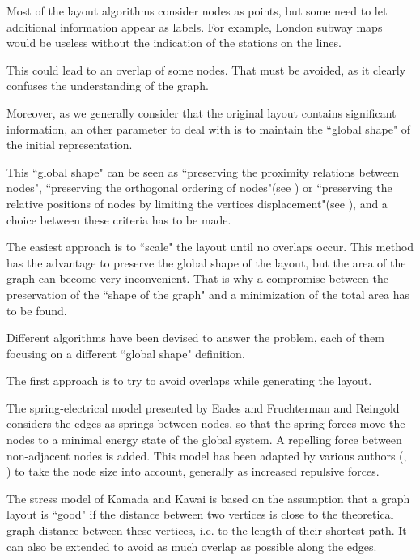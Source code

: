 \documentclass[12pt]{report}
\begin{document}
\bigskip
Most of the layout algorithms consider nodes as points, but some need to let additional information appear as labels. For example, London subway maps would be useless without the indication of the stations on the lines.

This could lead to an overlap of some nodes. That must be avoided, as it clearly confuses the understanding of the graph.

Moreover, as we generally consider that the original layout contains significant information, an other parameter to deal with is to maintain the ``global shape" of the initial representation. 

This ``global shape" can be seen as ``preserving the proximity relations between nodes", ``preserving the orthogonal ordering of nodes"(see \cite{Mis95}) or ``preserving the relative positions of nodes by limiting the vertices displacement"(see \cite{Gansner98}), and a choice between these criteria has to be made.

The easiest approach is to ``scale" the layout until no overlaps occur. This method has the advantage to preserve the global shape of the layout, but the area of the graph can become very inconvenient. That is why a compromise between the preservation of the ``shape of the graph" and a minimization of the total area has to be found.

Different algorithms have been devised to answer the problem, each of them focusing on a different ``global shape" definition. 

\bigskip
The first approach is to try to avoid overlaps while generating the layout.

The spring-electrical model presented by Eades \cite{Eades84} and Fruchterman and Reingold \cite{FR91} considers the edges as springs between nodes, so that the spring forces move the nodes to a minimal energy state of the global system. A repelling force between non-adjacent nodes is added.
This model has been adapted by various authors (\cite{HK02}, \cite{Li05}) to take the node size into account, generally as increased repulsive forces.

The stress model of Kamada and Kawai \cite{Kamada89} is based on the assumption that a graph layout is ``good" if the distance between two vertices is close to the theoretical graph distance between these vertices, i.e. to the length of their shortest path. It can also be extended to avoid as much overlap as possible along the edges.
\end{document}
